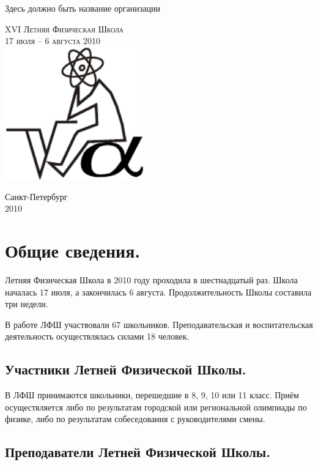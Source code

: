 \documentclass[12pt,a4paper,oneside,draft]{scrartcl}
\begin{document}
\parindent=5mm
\begin{center}
  \small{\textsf{Здесь должно быть название организации}}

\vfill
\LARGE{\textsc{XVI Летняя Физическая Школа}}\\
\Large{\textsc{17 июля -- 6 августа 2010}}\\[2cm]
\includegraphics[width=6cm]{logo.pdf}
\vfill

\small{\textsf{Санкт-Петербург}\\
\textsf{2010}}
\end{center}

\clearpage
\section{Общие сведения.}
\label{sec:general}

Летняя Физическая Школа в 2010 году проходила в шестнадцатый
раз. Школа началась 17 июля, а закончилась 6
августа. Продолжительность Школы составила три недели. 

В работе ЛФШ участвовали 67 школьников. Преподавательская и воспитательская
деятельность осуществлялась силами 18 человек.

\subsection{Участники Летней Физической Школы. }
\label{sec:scholars}

В ЛФШ принимаются школьники, перешедшие в 8, 9, 10 или 11 класс. Приём
осуществляется либо по результатам городской или региональной
олимпиады по физике, либо по результатам собеседования с
руководителями смены.
\smallskip






\subsection{Преподаватели Летней Физической Школы. }
\label{sec:teachers}
\end{document}
